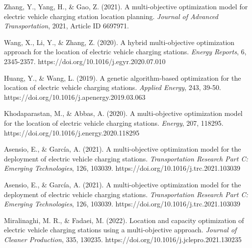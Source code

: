 \begin{thebibliography}{99}
    Zhang, Y., Yang, H., \& Gao, Z. (2021). A multi-objective optimization model for electric vehicle charging station location planning. \textit{Journal of Advanced Transportation}, 2021, Article ID 6697971.

     Wang, X., Li, Y., \& Zhang, Z. (2020). A hybrid multi-objective optimization approach for the location of electric vehicle charging stations. \textit{Energy Reports}, 6, 2345-2357. https://doi.org/10.1016/j.egyr.2020.07.010

     Huang, Y., \& Wang, L. (2019). A genetic algorithm-based optimization for the location of electric vehicle charging stations. \textit{Applied Energy}, 243, 39-50. https://doi.org/10.1016/j.apenergy.2019.03.063


     Khodaparastan, M., \& Abbas, A. (2020). A multi-objective optimization model for the location of electric vehicle charging stations. \textit{Energy}, 207, 118295. https://doi.org/10.1016/j.energy.2020.118295

     Asensio, E., \& García, A. (2021). A multi-objective optimization model for the deployment of electric vehicle charging stations. \textit{Transportation Research Part C: Emerging Technologies}, 126, 103039. https://doi.org/10.1016/j.trc.2021.103039


     Asensio, E., \& García, A. (2021). A multi-objective optimization model for the deployment of electric vehicle charging stations. \textit{Transportation Research Part C: Emerging Technologies}, 126, 103039. https://doi.org/10.1016/j.trc.2021.103039


     Miralinaghi, M. R., \& Fadaei, M. (2022). Location and capacity optimization of electric vehicle charging stations using a multi-objective approach. \textit{Journal of Cleaner Production}, 335, 130235. https://doi.org/10.1016/j.jclepro.2021.130235


\end{thebibliography}
